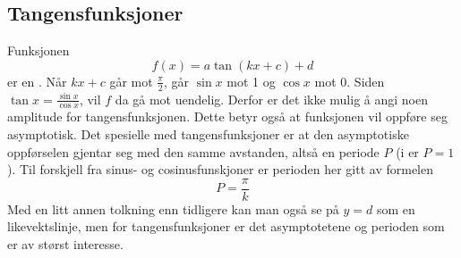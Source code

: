 \subsection{Tangensfunksjoner}
Funksjonen
\[ f(x)= a\tan(kx+c)+d \]
er en . Når $ kx+c$ går mot $ \frac{\pi}{2}$, går $ \sin x $ mot 1 og $ \cos x $ mot 0. Siden $ {\tan x = \frac{\sin x}{\cos x}} $, vil $ f $ da gå mot uendelig. Derfor er det ikke mulig å angi noen amplitude for tangensfunksjonen. Dette betyr også at funksjonen vil oppføre seg asymptotisk.\vs
{}
Det spesielle med tangensfunksjoner er at den asymptotiske oppførselen gjentar seg med den samme avstanden, altså en periode $ P $ (i  er $ {P=1} $). Til forskjell fra  sinus- og cosinusfunskjoner er perioden her gitt av formelen
\[ P=\frac{\pi}{k} \]
Med en litt annen tolkning enn tidligere kan man også se på ${ y=d} $ som en likevektslinje, men for tangensfunksjoner er det asymptotetene og perioden som er av størst interesse. \regv
{}
\newpage
\subsection{\deravtri \label{deravtri}}
\reg[\deravtri]{ \vsb
\begin{align*}
	& (\cos x)' = -\sin x \vn
	& (\sin x)' = \cos x  \vn
	& (\tan x)' =  \frac{1}{\cos^{2}x} =  1+\tan^{2} x
\end{align*}
}\vsk

